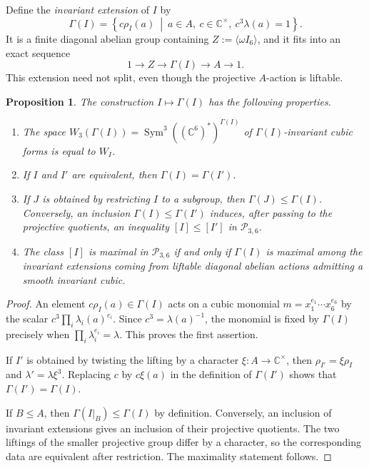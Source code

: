 \documentclass[12pt]{amsart}
\numberwithin{equation}{section}
\theoremstyle{plain}
\newtheorem{prop}[thm]{Proposition}
\theoremstyle{definition}
\theoremstyle{remark}
\newcommand{\CC}{\mathbb C}
\DeclareMathOperator{\Sym}{Sym}
\begin{document}
Define the \emph{invariant extension} of $I$ by
$$
\Gamma(I)=
\left\{
c\rho_I(a)\ \middle|\
a\in A,\ c\in\CC^\times,\ c^3\lambda(a)=1
\right\}.
$$
It is a finite diagonal abelian group containing
$Z:=\langle\omega I_6\rangle$, and it fits into an exact sequence
$$
1\longrightarrow Z\longrightarrow\Gamma(I)
\longrightarrow A\longrightarrow1.
$$
This extension need not split, even though the projective $A$-action is
liftable.

\begin{prop}\label{prop:character-to-invariant}
The construction $I\mapsto\Gamma(I)$ has the following properties.
\begin{enumerate}
    \item The space
    $W_3(\Gamma(I))=\Sym^3((\CC^6)^*)^{\Gamma(I)}$ of
    $\Gamma(I)$-invariant cubic forms is equal to $W_I$.

    \item If $I$ and $I'$ are equivalent, then
    $\Gamma(I)=\Gamma(I')$.

    \item If $J$ is obtained by restricting $I$ to a subgroup, then
    $\Gamma(J)\leq\Gamma(I)$.  Conversely, an inclusion
    $\Gamma(I)\leq\Gamma(I')$ induces, after passing to the projective
    quotients, an inequality $[I]\leq[I']$ in
    $\mathcal P_{3,6}$.

    \item The class $[I]$ is maximal in $\mathcal P_{3,6}$ if and only if
    $\Gamma(I)$ is maximal among the invariant extensions coming from
    liftable diagonal abelian actions admitting a smooth invariant cubic.
\end{enumerate}
\end{prop}

\begin{proof}
An element $c\rho_I(a)\in\Gamma(I)$ acts on a cubic monomial $m=x_1^{e_1}\cdots x_6^{e_6}$ by the scalar $c^3\prod_i\lambda_i(a)^{e_i}$.
Since $c^3=\lambda(a)^{-1}$, the monomial is fixed by $\Gamma(I)$ precisely when
$\prod_i\lambda_i^{e_i}=\lambda$.  This proves the first assertion.

If $I'$ is obtained by twisting the lifting by a character
$\xi\colon A\to\CC^\times$, then
$\rho_{I'}=\xi\rho_I$ and $\lambda'=\lambda\xi^3$.  Replacing $c$ by
$c\xi(a)$ in the definition of $\Gamma(I')$ shows that
$\Gamma(I')=\Gamma(I)$.

If $B\leq A$, then $\Gamma(I|_B)\leq\Gamma(I)$ by definition.  Conversely,
an inclusion of invariant extensions gives an inclusion of their
projective quotients.  The two liftings of the smaller projective group
differ by a character, so the corresponding data are equivalent after
restriction.  The maximality statement follows.
\end{proof}
\end{document}
